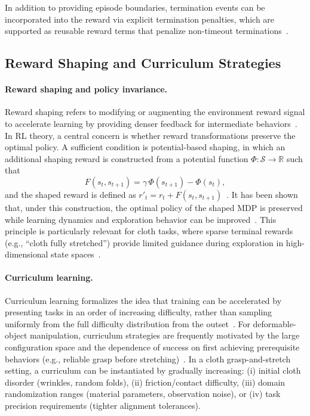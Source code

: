 In addition to providing episode boundaries, termination events can be incorporated into the reward via explicit termination penalties, which are supported as reusable reward terms that penalize non-timeout terminations~\cite{isaaclab_mdp_terms_api}.

\subsection{Reward Shaping and Curriculum Strategies}

\paragraph{Reward shaping and policy invariance.}
Reward shaping refers to modifying or augmenting the environment reward signal to accelerate learning by providing denser feedback for intermediate behaviors~\cite{SuttonBarto2018}. In \ac{RL} theory, a central concern is whether reward transformations preserve the optimal policy. A sufficient condition is potential-based shaping, in which an additional shaping reward is constructed from a potential function $\Phi: \mathcal{S} \rightarrow \mathbb{R}$ such that
\begin{equation}
F(s_t, s_{t+1}) = \gamma \, \Phi(s_{t+1}) - \Phi(s_t),
\label{eq:potential_based_shaping}
\end{equation}
and the shaped reward is defined as $r'_t = r_t + F(s_t, s_{t+1})$~\cite{Ng1999RewardShaping,Asmuth2008PotentialBasedShaping}. It has been shown that, under this construction, the optimal policy of the shaped \ac{MDP} is preserved while learning dynamics and exploration behavior can be improved~\cite{Asmuth2008PotentialBasedShaping}. This principle is particularly relevant for cloth tasks, where sparse terminal rewards (e.g., ``cloth fully stretched'') provide limited guidance during exploration in high-dimensional state spaces~\cite{Lin2021SoftGym,Kadi2023ClothLikeReview}.

\paragraph{Curriculum learning.}
Curriculum learning formalizes the idea that training can be accelerated by presenting tasks in an order of increasing difficulty, rather than sampling uniformly from the full difficulty distribution from the outset~\cite{Bengio2009Curriculum}. For deformable-object manipulation, curriculum strategies are frequently motivated by the large configuration space and the dependence of success on first achieving prerequisite behaviors (e.g., reliable grasp before stretching)~\cite{Kadi2023ClothLikeReview}. In a cloth grasp-and-stretch setting, a curriculum can be instantiated by gradually increasing:
(i) initial cloth disorder (wrinkles, random folds),
(ii) friction/contact difficulty,
(iii) domain randomization ranges (material parameters, observation noise), or
(iv) task precision requirements (tighter alignment tolerances). %

